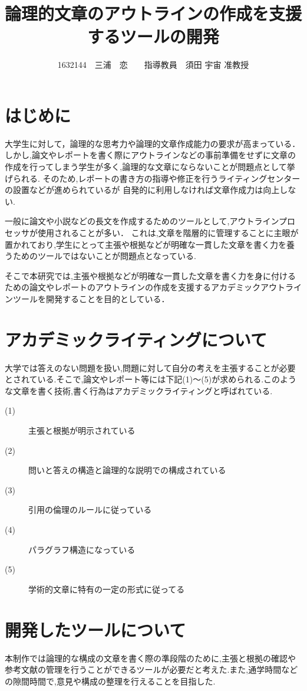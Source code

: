 \documentclass[twocolumn,10pt,a4j]{jsarticle}
\title{論理的文章のアウトラインの作成を支援するツールの開発}
\author{1632144　三浦　恋　　指導教員　須田 宇宙 准教授}
\date{}
\begin{document}
\maketitle

\section{はじめに}

大学生に対して，論理的な思考力や論理的文章作成能力の要求が高まっている．
しかし,論文やレポートを書く際にアウトラインなどの事前準備をせずに文章の作成を行ってしまう学生が多く,論理的な文章にならないことが問題点として挙げられる.
そのため,レポートの書き方の指導や修正を行うライティングセンターの設置などが進められているが
自発的に利用しなければ文章作成力は向上しない.

一般に論文や小説などの長文を作成するためのツールとして,アウトラインプロセッサが使用されることが多い．
これは,文章を階層的に管理することに主眼が置かれており,学生にとって主張や根拠などが明確な一貫した文章を書く力を養うためのツールではないことが問題点となっている.

そこで本研究では,主張や根拠などが明確な一貫した文章を書く力を身に付けるための論文やレポートのアウトラインの作成を支援するアカデミックアウトラインツールを開発することを目的としている．

\section{アカデミックライティングについて}
大学では答えのない問題を扱い,問題に対して自分の考えを主張することが必要とされている.そこで,論文やレポート等には下記(1)〜(5)が求められる.このような文章を書く技術,書く行為はアカデミックライティングと呼ばれている\cite{ren01}.

\begin{description}
  \item[(1)] 主張と根拠が明示されている
  \item[(2)] 問いと答えの構造と論理的な説明での構成されている
  \item[(3)] 引用の倫理のルールに従っている
  \item[(4)] パラグラフ構造になっている
  \item[(5)] 学術的文章に特有の一定の形式に従ってる
\end{description}

\section{開発したツールについて}
本制作では論理的な構成の文章を書く際の準段階のために,主張と根拠の確認や参考文献の管理を行うことができるツールが必要だと考えた.また,通学時間などの隙間時間で,意見や構成の整理を行えることを目指した.
\end{document}
